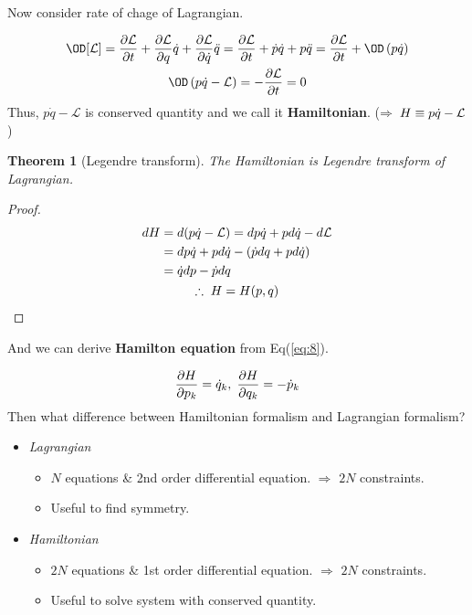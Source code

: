 \documentclass[final]{IEEEphot}
\newtheorem{theorem}{Theorem}[section]
\newcommand{\PD}[2]{\dfrac{\partial #1}{\partial #2}} %
\newcommand{\q}{\dot{q}}
\renewcommand{\L}{\mathcal{L}} %
\newcommand{\BKS}[1]{\left( #1 \right)} %
\newcommand{\VS}{\vspace{0.3cm}} %
\newcommand{\Com}{,\hspace{0.1cm}} %
\newcommand{\hs}{\hspace{0.1cm}} %
\begin{document}
\VS

Now consider rate of chage of Lagrangian.

\begin{gather}
 \OD[\L] = \PD{\L}{t} + \PD{\L}{q}\q + \PD{\L}{\q}\ddot{q} = \PD{\L}{t} + \dot{p}\q + p\ddot{q} = \PD{\L}{t} + \OD \BKS{p\q} \nonumber \\
 \OD \BKS{p\q - \L} = - \PD{\L}{t} = 0        
\end{gather}
Thus, $p\q -\L$ is conserved quantity and we call it \textbf{Hamiltonian}. ($\Rightarrow \hs H \equiv p\q -\L$)
\VS
\begin{theorem}[Legendre transform]
 The Hamiltonian is Legendre transform of Lagrangian.
\end{theorem}
\VS
\begin{proof}
 \begin{gather}
 \label{eq:8}
  \begin{split}
   dH &= d(p\q - \L) = dp\q + pd\q - d\L \\
       &= dp\q + pd\q - (\dot{p}dq + pd\q) \\
       &= \q dp - \dot{p}dq       
  \end{split} \\
  \therefore \hs H = H (p,q) \nonumber
 \end{gather}
\end{proof}
\VS
And we can derive \textbf{Hamilton equation} from Eq(\ref{eq:8}).

\begin{equation}
 \PD{H}{p_k} = \q_k\Com \PD{H}{q_k} = - \dot{p}_k
\end{equation}
Then what difference between Hamiltonian formalism and Lagrangian formalism?

\begin{itemize}
 \item \textit{Lagrangian}
  \begin{itemize}
    \item $N$ equations \& 2nd order differential equation. $\Rightarrow$ $2N$ constraints.
    \item Useful to find symmetry.
  \end{itemize}
 \item \textit{Hamiltonian}
  \begin{itemize}
    \item $2N$ equations \& 1st order differential equation. $\Rightarrow$ $2N$ constraints.
    \item Useful to solve system with conserved quantity.
  \end{itemize}
\end{itemize}
\end{document}
